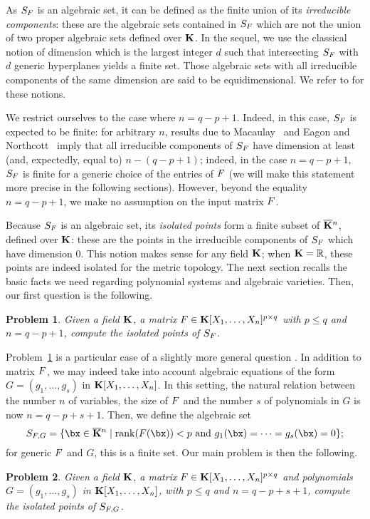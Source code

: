 \documentclass[12pt]{article}
\newtheorem{pbm}{Problem}
\begin{document}
As $S_{{F}}$ is an algebraic set, it can be defined as the finite union
of its \emph{irreducible components}: these are the algebraic sets
contained in $S_{{F}}$ which are not the union of two proper algebraic
sets defined over $\mathbf{K}$. In the sequel, we use the classical notion of
dimension which is the largest integer $d$ such that intersecting
$S_{{F}}$ with $d$ generic hyperplanes yields a finite set. Those
algebraic sets with all irreducible components of the same dimension
are said to be equidimensional. We refer to \cite[xxx]{Shafarevich77}
for these notions.

\smallskip
We restrict ourselves to the case where $n = q-p+1$.  Indeed, in this
case, $S_{{F}}$ is expected to be finite: for arbitrary $n$, results due
to Macaulay~\cite{Macaulay16} and Eagon and Northcott~\cite{EN62}
imply that all irreducible components of $S_{{F}}$ have dimension at
least (and, expectedly, equal to) $n-(q-p+1)$; indeed, in the case
$n = q-p+1$, $S_{{F}}$ is finite for a generic choice of the entries of
${F}$ (we will make this statement more precise in the following
sections). However, beyond the equality $n = q-p+1$, we make no
assumption on the input matrix ${F}$.

Because $S_{{F}}$ is an algebraic set, its {\em isolated points} form a
finite subset of $\overline{\mathbf{K}}{}^n$, defined over $\mathbf{K}$: these are the
points in the irreducible components of $S_{{F}}$ which have dimension
$0$. This notion makes sense for any field $\mathbf{K}$; when
$\mathbf{K}=\mathbb{R}$, these points are indeed isolated for the metric
topology. The next section recalls the basic facts we need regarding
polynomial systems and algebraic varieties.  Then, our first question
is the following.


\begin{pbm} \label{problem} 
  Given a field $\mathbf{K}$, a matrix ${F} \in \mathbf{K}[X_1,\dots,X_n]^{p \times q}$ with $p
  \leq q$ and $n = q-p+1$, compute the isolated points of $S_{{F}}$.
\end{pbm}

Problem~\ref{problem} is a particular case of a slightly more general
question%
. In addition to matrix ${F}$, we may indeed take into account
algebraic equations of the form $G=(g_1,\dots,g_s)$ in
$\mathbf{K}[X_1,\dots,X_n]$. In this setting, the natural relation between
the number $n$ of variables, the size of ${F}$ and the number $s$ of
polynomials in $G$ is now $n=q-p+s+1$. Then, we define the algebraic
set
$$S_{\mF,G} =  \{\bx \in \KKbar{}^n \mid
\mathrm{rank}(\mF({\bx})) < p \text{~and~}
g_1(\bx)=\cdots=g_s(\bx)=0   \};$$
for generic ${F}$ and $G$, this is a finite set. Our main problem is then
the following.
\begin{pbm} \label{problem2} 
  Given a field $\mathbf{K}$, a matrix ${F} \in \mathbf{K}[X_1,\dots,X_n]^{p \times q}$ and
  polynomials $G=(g_1,\dots,g_s)$ in $\mathbf{K}[X_1,\dots,X_n]$, with $p \leq q$ and
  $n = q-p+s+1$, compute the isolated points of $S_{{F},G}$.
\end{pbm}
\end{document}
